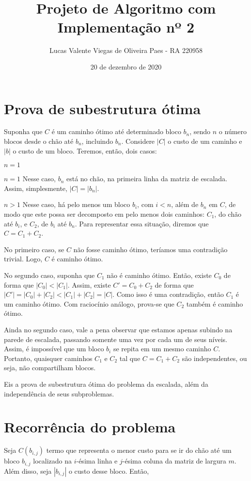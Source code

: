 \documentclass[12pt,a4paper]{article}
\title{Projeto de Algoritmo com Implementação nº 2}
\date{20 de dezembro de 2020}
\author{Lucas Valente Viegas de Oliveira Paes - RA 220958}
\begin{document}
  \maketitle

  \section{Prova de subestrutura ótima}
  Suponha que $C$ é um caminho ótimo até determinado bloco $b_n$, sendo $n$ o número blocos desde o chão até $b_n$, incluindo $b_n$. Considere $|C|$ o custo de um caminho e $|b|$ o custo de um bloco. Teremos, então, dois casos:
  \begin{labeling}{$n = 1$}
    \item [$n = 1$] Nesse caso, $b_n$ está no chão, na primeira linha da matriz de escalada. Assim, simplesmente, $|C| = |b_n|$.
    \item [$n > 1$] Nesse caso, há pelo menos um bloco $b_i$, com $i < n$, além de $b_n$ em $C$, de modo que este possa ser decomposto em pelo menos dois caminhos: $C_1$, do chão até $b_i$, e $C_2$, de $b_i$ até $b_n$. Para representar essa situação, diremos que $C = C_1 + C_2$.
  \end{labeling}

  No primeiro caso, se $C$ não fosse caminho ótimo, teríamos uma contradição trivial. Logo, $C$ é caminho ótimo.

  No segundo caso, suponha que $C_1$ não é caminho ótimo. Então, existe $C_0$ de forma que $|C_0| < |C_1|$. Assim, existe $C' = C_0 + C_2$ de forma que $|C'| = |C_0| + |C_2| < |C_1| + |C_2| = |C|$. Como isso é uma contradição, então $C_1$ é um caminho ótimo. Com raciocínio análogo, prova-se que $C_2$ também é caminho ótimo.

  Ainda no segundo caso, vale a pena observar que estamos apenas subindo na parede de escalada, passando somente uma vez por cada um de seus níveis. Assim, é impossível que um bloco $b_i$ se repita em um mesmo caminho $C$. Portanto, quaisquer caminhos $C_1$ e $C_2$ tal que $C = C_1 + C_2$ são independentes, ou seja, não compartilham blocos.

  Eis a prova de subestrutura ótima do problema da escalada, além da independência de seus subproblemas.

  \section{Recorrência do problema}
  Seja $C(b_{i,j})$ termo que representa o menor custo para se ir do chão até um bloco $b_{i,j}$ localizado na $i$-ésima linha e $j$-ésima coluna da matriz de largura $m$. Além disso, seja $|b_{i,j}|$ o custo desse bloco. Então,
\end{document}
